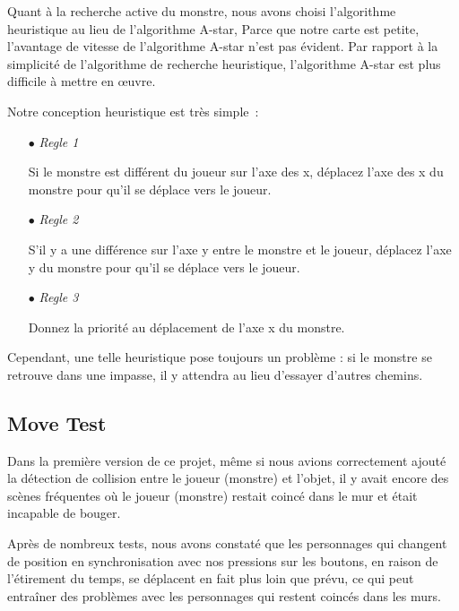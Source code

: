 \documentclass[11pt,english]{article}
\begin{document}
\indent Quant à la recherche active du monstre, nous avons choisi l'algorithme heuristique au lieu de l'algorithme A-star, Parce que notre carte est petite, l'avantage de vitesse de l'algorithme A-star n'est pas évident. Par rapport à la simplicité de l'algorithme de recherche heuristique, l'algorithme A-star est plus difficile à mettre en œuvre.

\indent Notre conception heuristique est très simple :

\small
{
\begin{itemize}
    \item [$\bullet$] \textit{Regle 1}
    
    Si le monstre est différent du joueur sur l'axe des x, déplacez l'axe des x du monstre pour qu'il se déplace vers le joueur.

    \item [$\bullet$] \textit{Regle 2}
    
    S'il y a une différence sur l'axe y entre le monstre et le joueur, déplacez l'axe y du monstre pour qu'il se déplace vers le joueur.

    \item [$\bullet$] \textit{Regle 3}
    
    Donnez la priorité au déplacement de l’axe x du monstre.

\end{itemize}
}

\large

\indent Cependant, une telle heuristique pose toujours un problème : si le monstre se retrouve dans une impasse, il y attendra au lieu d’essayer d’autres chemins.

\subsection{Move Test}

\indent 

Dans la première version de ce projet, même si nous avions correctement ajouté la détection de collision entre le joueur (monstre) et l'objet, il y avait encore des scènes fréquentes où le joueur (monstre) restait coincé dans le mur et était incapable de bouger.

\indent Après de nombreux tests, nous avons constaté que les personnages qui changent de position en synchronisation avec nos pressions sur les boutons, en raison de l'étirement du temps, se déplacent en fait plus loin que prévu, ce qui peut entraîner des problèmes avec les personnages qui restent coincés dans les murs.
\end{document}

